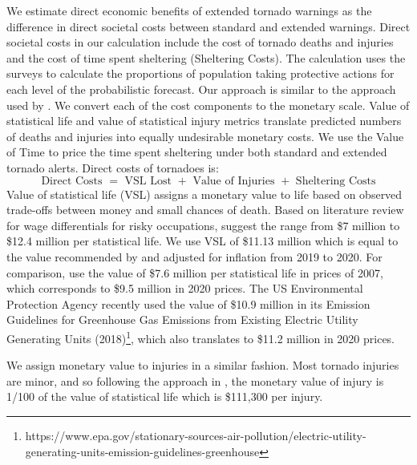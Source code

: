 \documentclass{ametsocV6.1}
\newcommand{\add}[1]{{\color{red}#1}}
\begin{document}
We estimate direct economic benefits of extended tornado warnings as the difference in direct societal costs between standard and extended warnings. Direct societal costs in our calculation include the cost of tornado deaths and injuries and the cost of time spent sheltering (Sheltering Costs). \add{The calculation uses the surveys to calculate the proportions of population taking protective actions for each level of the probabilistic forecast.} Our approach is similar to the approach used by \citet{simmons_economic_2013}. We convert each of the cost components to the monetary scale. Value of statistical life and value of statistical injury metrics translate predicted numbers of deaths and injuries into equally undesirable monetary costs. We use the Value of Time to price the time spent sheltering under both standard and extended tornado alerts. Direct costs of tornadoes is:
$$\mbox{Direct Costs }=\mbox{ VSL Lost }+\mbox{ Value of Injuries }+\mbox{ Sheltering Costs}$$
Value of statistical life (VSL) assigns a monetary value to life based on observed trade-offs between money and small chances of death. Based on literature review for wage differentials for risky occupations, \citet{viscusi_value_2003} suggest the range from \$7 million to \$12.4 million per statistical life. We use VSL of \$11.13 million which is equal to the value recommended by \citet{kniesner_value_2019} and adjusted for inflation from 2019 to 2020. For comparison, \citet{simmons_economic_2013} use the value of \$7.6 million per statistical life in prices of 2007, which corresponds to \$9.5 million in 2020 prices.  The US Environmental Protection Agency recently used the value of \$10.9 million in its Emission Guidelines for Greenhouse Gas Emissions from Existing Electric Utility Generating Units (2018)\footnote{https://www.epa.gov/stationary-sources-air-pollution/electric-utility-generating-units-emission-guidelines-greenhouse}, which also translates to \$11.2 million in 2020 prices.

We  assign monetary value to injuries in a similar fashion. Most tornado injuries are minor, and so following the approach in \citep*{simmons_direct_2006, simmons_economic_2013}, the monetary value of injury is 1/100 of the value of statistical life which is \$111,300 per injury.
\end{document}
